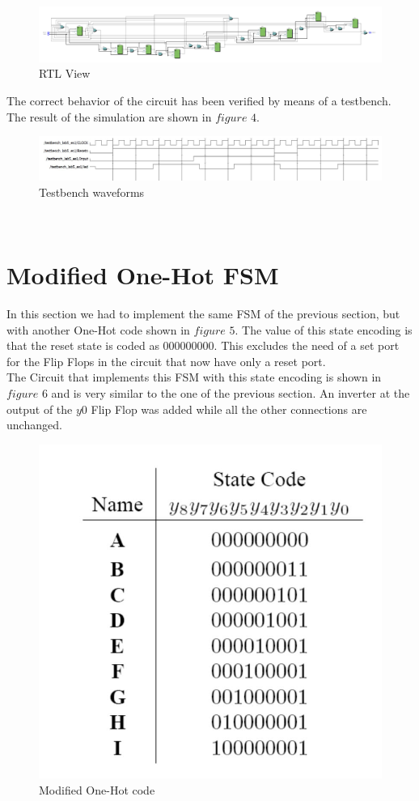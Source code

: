 \documentclass[12pt]{article}
\begin{document}
\begin{figure}[h]
	\centering
	\includegraphics[scale = 0.55]{immagini/Berchialla/RT1.jpg}
	\caption{RTL View}
\end{figure}


The correct behavior of the circuit has been verified by means of a testbench. The result of the simulation are shown in $figure$ $4$.
\begin{figure}[h]
	\centering
	\includegraphics[scale = 0.65]{immagini/Berchialla/TB1.jpg}
	\caption{Testbench waveforms}
\end{figure}
\\
\newpage
\section{Modified One-Hot FSM}
In this section we had to implement the same FSM of the previous section, but with another One-Hot code shown in $figure$ $5$. The value of this state encoding is that the reset state is coded as $000000000$. This excludes the need of a set port for the Flip Flops in the circuit that now have only a reset port.\\
The Circuit that implements this FSM with this state encoding is shown in $figure$ $6$ and is very similar to the one of the previous section. An inverter at the output of the $y0$ Flip Flop was added while all the other connections are unchanged.
\begin{figure}[h]
	\centering
	\includegraphics[scale = 0.7]{immagini/Berchialla/Code2.jpg}
	\caption{Modified One-Hot code}
\end{figure}
\end{document}
